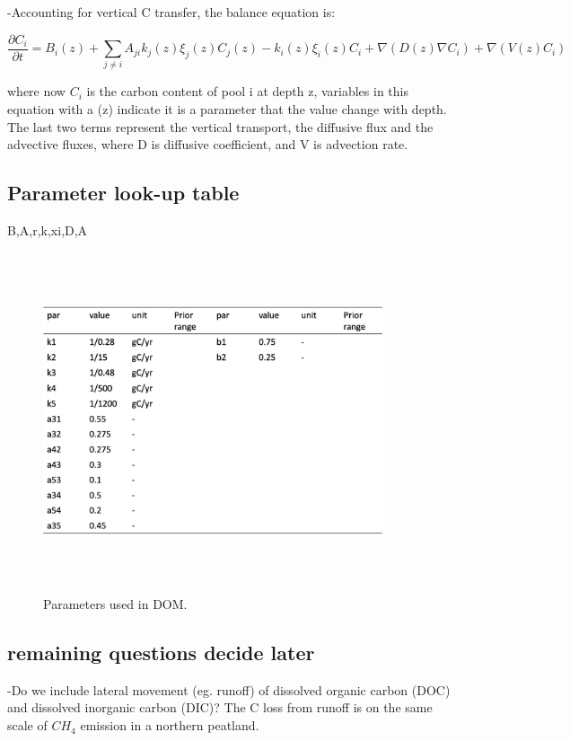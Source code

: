 \documentclass[twoside,10pt]{report}
\begin{document}
-Accounting for vertical C transfer, the balance equation is:

\begin{equation}
\frac{\partial C_i}{\partial t} = B_i(z) + \sum_{j\neq i}A_{ji}k_j(z)\xi_j(z)C_j(z) - k_i(z)\xi_i(z)C_i + \nabla(D(z)\nabla C_i) + \nabla(V(z)C_i)
\end{equation}

    where now $C_i$ is the carbon content of pool i at depth z, variables in this equation with a (z) indicate it is a parameter that the value change with depth. The last two terms represent the vertical transport, the diffusive flux and the advective fluxes, where D is diffusive coefficient, and V is advection rate.



\subsection{Parameter look-up table}
B,A,r,k,xi,D,A
\begin{figure}[htb]
\includegraphics[width=10cm,height=10cm,keepaspectratio]{CLIMA-land/LM_figures/DOM_parlist_v2.png}
\caption{Parameters used in DOM.}
\label{f:Parameters used in DOM.}
\end{figure}

\subsection{remaining questions decide later}

-Do we include lateral movement (eg. runoff) of dissolved organic carbon (DOC) and dissolved inorganic carbon (DIC)? The C loss from runoff is on the same scale of $CH_4$ emission in a northern peatland.
\end{document}
